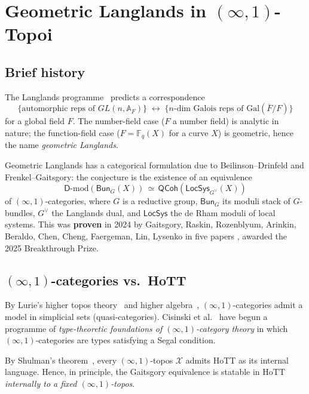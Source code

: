 \documentclass[12pt]{article}
\theoremstyle{definition}
\theoremstyle{remark}
\newcommand{\F}{\mathbb{F}}
\begin{document}
\section{Geometric Langlands in $(\infty,1)$-Topoi}\label{sec:langlands}

\subsection{Brief history}

The Langlands programme~\cite{Langlands1970} predicts a correspondence
\[
\bigl\{ \text{automorphic reps of } GL(n,\mathbb{A}_F) \bigr\}
\;\longleftrightarrow\;
\bigl\{ \text{$n$-dim Galois reps of } \mathrm{Gal}(\overline{F}/F) \bigr\}
\]
for a global field $F$. The number-field case ($F$ a number field) is
analytic in nature; the function-field case ($F = \F_q(X)$ for a curve $X$)
is geometric, hence the name \emph{geometric Langlands}.

Geometric Langlands has a categorical formulation due to Beilinson--Drinfeld
\cite{BeilinsonDrinfeld2004} and Frenkel--Gaitsgory: the conjecture is
the existence of an equivalence
\[
\mathsf{D}\text{-mod}(\mathsf{Bun}_G(X)) \,\simeq\, \mathsf{QCoh}(\mathsf{LocSys}_{G^\vee}(X))
\]
of $(\infty,1)$-categories, where $G$ is a reductive group, $\mathsf{Bun}_G$
its moduli stack of $G$-bundles, $G^\vee$ the Langlands dual, and
$\mathsf{LocSys}$ the de Rham moduli of local systems. This was
\textbf{proven} in 2024 by Gaitsgory, Raskin, Rozenblyum, Arinkin, Beraldo,
Chen, Cheng, Faergeman, Lin, Lysenko in five papers
\cite{Gaitsgory2024GLC}, awarded the 2025 Breakthrough Prize.

\subsection{\texorpdfstring{$(\infty,1)$}{(infty,1)}-categories vs.\ HoTT}

By Lurie's higher topos theory~\cite{Lurie2009HTT} and higher
algebra~\cite{LurieHA}, $(\infty,1)$-categories
admit a model in simplicial sets (quasi-categories). Cisinski et al.\
\cite{CisinskiKKNS2025} have begun a programme of \emph{type-theoretic
foundations of $(\infty,1)$-category theory} in which $(\infty,1)$-categories
are types satisfying a Segal condition.

By Shulman's theorem~\cite{Shulman2019InfTopos}, every $(\infty,1)$-topos
$\mathcal{X}$ admits HoTT as its internal language. Hence, in principle,
the Gaitsgory equivalence is statable in HoTT \emph{internally to a fixed
$(\infty,1)$-topos}.
\end{document}
